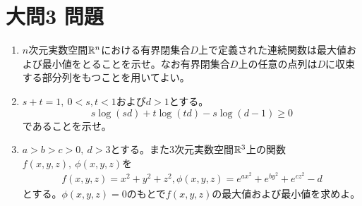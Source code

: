 \documentclass[dvipdfmx]{jsreport}
\begin{document}
\section{大問3 問題}
\begin{tcolorbox} %
\begin{enumerate}
	\item $n$次元実数空間$\mathbb{R}^n$における有界閉集合$D$上で定義された連続関数は最大値および最小値をとることを示せ。なお有界閉集合$D$上の任意の点列は$D$に収束する部分列をもつことを用いてよい。
	\item $s+ t= 1,\ 0< s, t< 1$および$d> 1$とする。
\begin{equation*}
	s\log{(sd)}+ t\log{(td)}- s\log{(d- 1)}\ge 0
\end{equation*}
	であることを示せ。
	\item $a> b> c> 0,\ d> 3$とする。また3次元実数空間$\mathbb{R}^3$上の関数$f(x, y, z),\ \phi(x, y, z)$を
\begin{align*}
	f(x, y, z)= x^2+ y^2+ z^2,
	\phi(x, y, z)= e^{ax^2}+ e^{by^2}+ e^{cz^2}- d
\end{align*}
	とする。$\phi(x, y, z)= 0$のもとで$f(x, y, z)$の最大値および最小値を求めよ。
\end{enumerate}
\end{tcolorbox}
\end{document}
